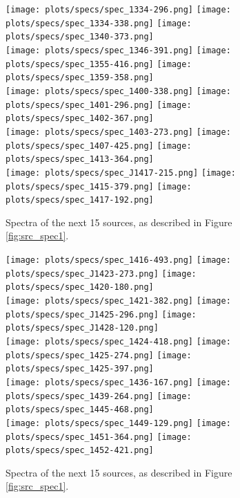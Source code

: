 \documentclass[preprint]{aastex}
\begin{document}
\begin{figure}\centering
\texttt{[image: plots/specs/spec\_1334-296.png]}
\texttt{[image: plots/specs/spec\_1334-338.png]}
\texttt{[image: plots/specs/spec\_1340-373.png]}\\
\texttt{[image: plots/specs/spec\_1346-391.png]}
\texttt{[image: plots/specs/spec\_1355-416.png]}
\texttt{[image: plots/specs/spec\_1359-358.png]}\\
\texttt{[image: plots/specs/spec\_1400-338.png]}
\texttt{[image: plots/specs/spec\_1401-296.png]}
\texttt{[image: plots/specs/spec\_1402-367.png]}\\
\texttt{[image: plots/specs/spec\_1403-273.png]}
\texttt{[image: plots/specs/spec\_1407-425.png]}
\texttt{[image: plots/specs/spec\_1413-364.png]}\\
\texttt{[image: plots/specs/spec\_J1417-215.png]}
\texttt{[image: plots/specs/spec\_1415-379.png]}
\texttt{[image: plots/specs/spec\_1417-192.png]}\\
\caption{Spectra of the next 15 sources, as described in Figure \ref{fig:src_spec1}.
}\label{fig:src_spec20}
\end{figure}\clearpage

\begin{figure}\centering
\texttt{[image: plots/specs/spec\_1416-493.png]}
\texttt{[image: plots/specs/spec\_J1423-273.png]}
\texttt{[image: plots/specs/spec\_1420-180.png]}\\
\texttt{[image: plots/specs/spec\_1421-382.png]}
\texttt{[image: plots/specs/spec\_J1425-296.png]}
\texttt{[image: plots/specs/spec\_J1428-120.png]}\\
\texttt{[image: plots/specs/spec\_1424-418.png]}
\texttt{[image: plots/specs/spec\_1425-274.png]}
\texttt{[image: plots/specs/spec\_1425-397.png]}\\
\texttt{[image: plots/specs/spec\_1436-167.png]}
\texttt{[image: plots/specs/spec\_1439-264.png]}
\texttt{[image: plots/specs/spec\_1445-468.png]}\\
\texttt{[image: plots/specs/spec\_1449-129.png]}
\texttt{[image: plots/specs/spec\_1451-364.png]}
\texttt{[image: plots/specs/spec\_1452-421.png]}\\
\caption{Spectra of the next 15 sources, as described in Figure \ref{fig:src_spec1}.
}\label{fig:src_spec21}
\end{figure}\clearpage
\end{document}
